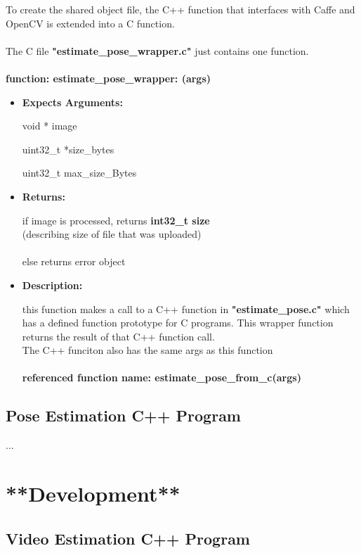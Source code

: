 \documentclass{scrreprt}
\begin{document}
To create the shared object file, the C++ function that interfaces with Caffe and OpenCV is extended into a C function.
\\\\
The C file \textbf{"estimate\_pose\_wrapper.c"} just contains one function.
\\\\
\textbf{function: estimate\_pose\_wrapper: (args)}
\begin{itemize}
    \item \textbf{Expects Arguments:}

    void * image

    uint32\_t *size\_bytes

    uint32\_t max\_size\_Bytes

    \item \textbf{Returns:}

    if image is processed, returns \textbf{int32\_t size}
    \\(describing size of file that was uploaded)
    \\\\
    else returns error object

    \item \textbf{Description:}

    this function makes a call to a C++ function in \textbf{"estimate\_pose.c"} which has a defined function prototype for C programs. This wrapper function returns the result of that C++ function call.
    \\
    The C++ funciton also has the same args as this function
    \\\\
    \textbf{referenced function name: estimate\_pose\_from\_c(args)}

\end{itemize}


\subsection{Pose Estimation C++ Program}

...

\section{**Development**}

\subsection{Video Estimation C++ Program}
\end{document}

